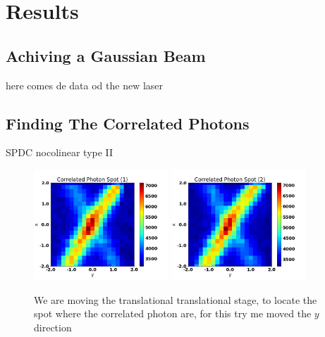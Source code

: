 
\chapter{Results} %

\label{Chapter4} %

\section{Achiving a Gaussian Beam}

here comes de data od the new laser 

\section{Finding The Correlated Photons}

SPDC nocolinear type II
\begin{figure}[h!]
\centering
{  \includegraphics[width=0.45\textwidth]{Figures/correlatedPhotonSpot1.png} }
{  \includegraphics[width=0.45\textwidth]{Figures/correlatedPhotonSpot2.png} }
\caption{We are moving the translational translational stage, to locate the spot where the correlated photon are, for this try me moved the $y$ direction}
 \label{fig:correlatedPhotonSpot}
\end{figure}


